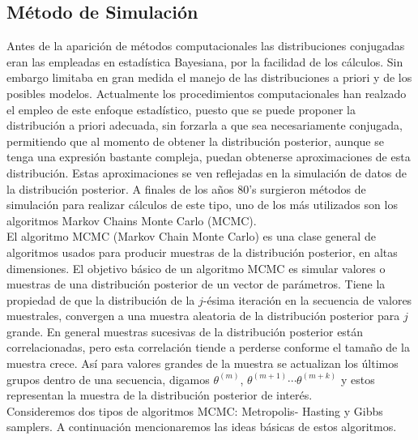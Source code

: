 \subsection{M\'etodo de Simulaci\'on}
\noindent Antes de la aparici\'on de m\'etodos computacionales las distribuciones conjugadas eran las empleadas en estad\'istica Bayesiana, por la facilidad de los c\'alculos. Sin embargo limitaba en gran medida el manejo de las distribuciones a priori y de los posibles modelos. Actualmente los procedimientos computacionales han realzado el empleo de este enfoque estad\'istico, puesto que se puede proponer la distribuci\'on a priori adecuada, sin forzarla a que sea necesariamente conjugada, permitiendo que al momento de obtener la distribuci\'on posterior, aunque se tenga una expresi\'on bastante compleja,  puedan obtenerse  aproximaciones de esta distribuci\'on. Estas aproximaciones se ven reflejadas en la simulaci\'on de datos de la distribuci\'on posterior. A finales de los a\~nos 80's surgieron m\'etodos de simulaci\'on para realizar c\'alculos de este tipo, uno de los m\'as utilizados son los algoritmos Markov Chains Monte Carlo (MCMC).\\[0.1cm]
\noindent El algoritmo MCMC (Markov Chain Monte Carlo) es una clase general de algoritmos usados para producir muestras de la distribuci\'on posterior, en altas dimensiones. El objetivo b\'asico de un algoritmo MCMC es simular valores o muestras de una distribuci\'on posterior  de un vector de par\'ametros. Tiene la propiedad de que la distribuci\'on de la $j$-\'esima iteraci\'on en la secuencia de valores muestrales, convergen a una muestra aleatoria de la distribuci\'on posterior para $j$ grande. En general muestras sucesivas de la distribuci\'on posterior est\'an correlacionadas, pero esta correlaci\'on tiende a perderse conforme el tama\~no de la muestra crece. As\'i para valores grandes de la muestra se actualizan los \'ultimos grupos dentro de una secuencia, digamos $\theta^{(m)}$, $\theta^{(m+1)} \cdots \theta^{(m+k)}$ y estos representan la muestra de la distribuci\'on posterior de inter\'es.\\[0.1cm]
\noindent Consideremos dos tipos de algoritmos MCMC: Metropolis- Hasting y Gibbs samplers. A continuaci\'on mencionaremos las ideas b\'asicas de estos algoritmos.

